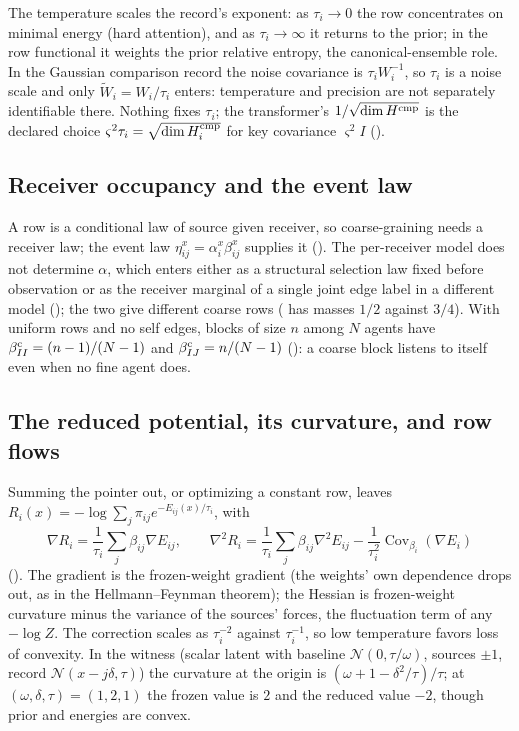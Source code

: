 The temperature scales the record's exponent: as $\tau_i\to0$ the row concentrates on minimal energy (hard
attention), and as $\tau_i\to\infty$ it returns to the prior; in the row functional it weights the prior relative
entropy, the canonical-ensemble role. In the Gaussian comparison record the noise covariance is $\tau_iW_i^{-1}$, so
$\tau_i$ is a noise scale and only $\widetilde W_i=W_i/\tau_i$ enters: temperature and precision are not separately
identifiable there. Nothing fixes $\tau_i$; the transformer's $1/\sqrt{\dim H^{\rm cmp}}$ is the declared choice
$\varsigma^2\tau_i=\sqrt{\dim H^{\rm cmp}_i}$ for key covariance $\varsigma^2I$ ().

\subsection{Receiver occupancy and the event law}
\label{comp:ch06-events}

A row is a conditional law of source given receiver, so coarse-graining needs a receiver law; the event law
$\eta^x_{ij}=\alpha^x_i\beta^x_{ij}$ supplies it (). The per-receiver model does not
determine $\alpha$, which enters either as a structural selection law fixed before observation or as the receiver
marginal of a single joint edge label in a different model (); the two give different
coarse rows ( has masses $1/2$ against $3/4$). With uniform rows and no
self edges, blocks of size $n$ among $N$ agents have $\beta^{\rm c}_{II}=(n-1)/(N-1)$ and
$\beta^{\rm c}_{IJ}=n/(N-1)$ (): a coarse block listens to itself even when no fine agent
does.

\subsection{The reduced potential, its curvature, and row flows}
\label{comp:ch06-curvature}

Summing the pointer out, or optimizing a constant row, leaves $R_i(x)=-\log\sum_j\pi_{ij}e^{-E_{ij}(x)/\tau_i}$, with
\[
\nabla R_i=\frac1{\tau_i}\sum_j\beta_{ij}\nabla E_{ij},
\qquad
\nabla^2R_i=\frac1{\tau_i}\sum_j\beta_{ij}\nabla^2E_{ij}-\frac1{\tau_i^2}\operatorname{Cov}_{\beta_i}(\nabla E_i)
\]
(). The gradient is the frozen-weight gradient (the weights' own dependence
drops out, as in the Hellmann--Feynman theorem); the Hessian is frozen-weight curvature minus the variance of the
sources' forces, the fluctuation term of any $-\log Z$. The correction scales as $\tau_i^{-2}$ against $\tau_i^{-1}$, so
low temperature favors loss of convexity. In the witness (scalar latent with baseline $\mathcal N(0,\tau/\omega)$,
sources $\pm1$, record $\mathcal N(x-j\delta,\tau)$) the curvature at the origin is $(\omega+1-\delta^2/\tau)/\tau$; at
$(\omega,\delta,\tau)=(1,2,1)$ the frozen value is $2$ and the reduced value $-2$, though prior and energies are convex.

